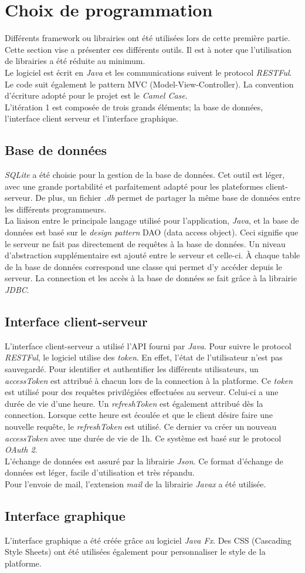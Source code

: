 \section{Choix de programmation}
Différents framework ou librairies ont été utilisées lors de cette première partie. Cette section vise a présenter ces différents outils. Il est à noter que l'utilisation de librairies a été réduite au minimum.\\
Le logiciel est écrit en \emph{Java} et les communications suivent le protocol \emph{RESTFul}. Le code suit également le pattern MVC (Model-View-Controller). La convention d'écriture adopté pour le projet est le \emph{Camel Case}.\\ L'itération 1 est composée de trois grands éléments; la base de données, l'interface client serveur et l'interface graphique.
\subsection{Base de données}
\emph{SQLite} a été choisie pour la gestion de la base de données. Cet outil est léger, avec une grande portabilité et parfaitement adapté pour les plateformes client-serveur. De plus, un fichier \emph{.db} permet de partager la même base de données entre les différents programmeurs. \\
La liaison entre le principale langage utilisé pour l'application, \emph{Java}, et la base de données est basé sur le \emph{design pattern} DAO (data access object). Ceci signifie que le serveur ne fait pas directement de requêtes à la base de données. Un niveau d'abstraction supplémentaire est ajouté entre le serveur et celle-ci. À chaque table de la base de données correspond une classe qui permet d'y accéder depuis le serveur. La connection et les accès à la base de données se fait grâce à la librairie \emph{JDBC}.
\subsection{Interface client-serveur}
L'interface client-serveur a utilisé l'API fourni par \emph{Java}. Pour suivre le protocol \emph{RESTFul}, le logiciel utilise des \emph{token}. En effet, l'état de l'utilisateur n'est pas sauvegardé. Pour identifier et authentifier les différents utilisateurs, un \emph{accessToken} est attribué à chacun lors de la connection à la platforme. Ce \emph{token} est utilisé pour des requêtes privilégiées effectuées au serveur. Celui-ci a une durée de vie d'une heure. Un \emph{refreshToken} est également attribué dès la connection. Lorsque cette heure est écoulée et que le client désire faire une nouvelle requête, le \emph{refreshToken} est utilisé. Ce dernier va créer un nouveau \emph{accessToken} avec une durée de vie de 1h.
Ce système est basé sur le protocol \emph{OAuth 2}.\\
L'échange de données est assuré par la librairie \emph{Json}. Ce format d'échange de données est léger, facile d'utilisation et très répandu. \\
Pour l'envoie de mail, l'extension \emph{mail} de la librairie \emph{Javax} a été utilisée.
\subsection{Interface graphique}
L'interface graphique a été créée grâce au logiciel \emph{Java Fx}. Des CSS (Cascading Style Sheets) ont été utilisées également pour personnaliser le style de la platforme.
